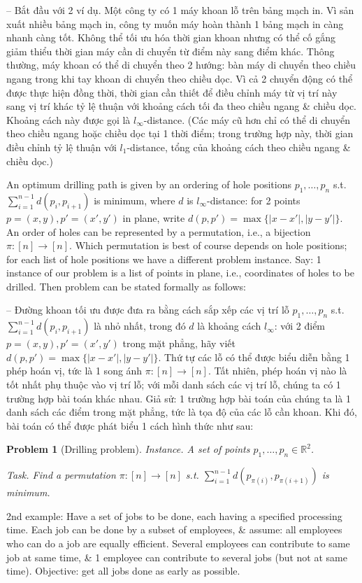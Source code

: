 \documentclass{article}
\newtheorem{problem}{Problem}
\begin{document}
\begin{itemize}
    -- Bắt đầu với 2 ví dụ. Một công ty có 1 máy khoan lỗ trên bảng mạch in. Vì sản xuất nhiều bảng mạch in, công ty muốn máy hoàn thành 1 bảng mạch in càng nhanh càng tốt. Không thể tối ưu hóa thời gian khoan nhưng có thể cố gắng giảm thiểu thời gian máy cần di chuyển từ điểm này sang điểm khác. Thông thường, máy khoan có thể di chuyển theo 2 hướng: bàn máy di chuyển theo chiều ngang trong khi tay khoan di chuyển theo chiều dọc. Vì cả 2 chuyển động có thể được thực hiện đồng thời, thời gian cần thiết để điều chỉnh máy từ vị trí này sang vị trí khác tỷ lệ thuận với khoảng cách tối đa theo chiều ngang \& chiều dọc. Khoảng cách này được gọi là $l_\infty$-distance. (Các máy cũ hơn chỉ có thể di chuyển theo chiều ngang hoặc chiều dọc tại 1 thời điểm; trong trường hợp này, thời gian điều chỉnh tỷ lệ thuận với $l_1$-distance, tổng của khoảng cách theo chiều ngang \& chiều dọc.)

    An optimum drilling path is given by an ordering of hole positions $p_1,\ldots,p_n$ s.t. $\sum_{i=1}^{n-1} d(p_i,p_{i+1})$ is minimum, where $d$ is $l_\infty$-distance: for 2 points $p = (x,y),p' = (x',y')$ in plane, write $d(p,p') = \max\{|x - x'|,|y - y'|\}$. An order of holes can be represented by a permutation, i.e., a bijection $\pi:[n]\to[n]$. Which permutation is best of course depends on hole positions; for each list of hole positions we have a different problem instance. Say: 1 instance of our problem is a list of points in plane, i.e., coordinates of holes to be drilled. Then problem can be stated formally as follows:

    -- Đường khoan tối ưu được đưa ra bằng cách sắp xếp các vị trí lỗ $p_1,\ldots,p_n$ s.t. $\sum_{i=1}^{n-1} d(p_i,p_{i+1})$ là nhỏ nhất, trong đó $d$ là khoảng cách $l_\infty$: với 2 điểm $p = (x,y),p' = (x',y')$ trong mặt phẳng, hãy viết $d(p,p') = \max\{|x - x'|,|y - y'|\}$. Thứ tự các lỗ có thể được biểu diễn bằng 1 phép hoán vị, tức là 1 song ánh $\pi:[n]\to[n]$. Tất nhiên, phép hoán vị nào là tốt nhất phụ thuộc vào vị trí lỗ; với mỗi danh sách các vị trí lỗ, chúng ta có 1 trường hợp bài toán khác nhau. Giả sử: 1 trường hợp bài toán của chúng ta là 1 danh sách các điểm trong mặt phẳng, tức là tọa độ của các lỗ cần khoan. Khi đó, bài toán có thể được phát biểu 1 cách hình thức như sau:

    \begin{problem}[Drilling problem]
        \item {\sf Instance.} A set of points $p_1,\ldots,p_n\in\mathbb{R}^2$.
        \item {\sf Task.} Find a permutation $\pi:[n]\to[n]$ s.t. $\sum_{i=1}^{n-1} d(p_{\pi(i)},p_{\pi(i + 1)})$ is minimum.
    \end{problem}
    2nd example: Have a set of jobs to be done, each having a specified processing time. Each job can be done by a subset of employees, \& assume: all employees who can do a job are equally efficient. Several employees can contribute to same job at same time, \& 1 employee can contribute to several jobs (but not at same time). Objective: get all jobs done as early as possible.


\end{itemize}
\end{document}

